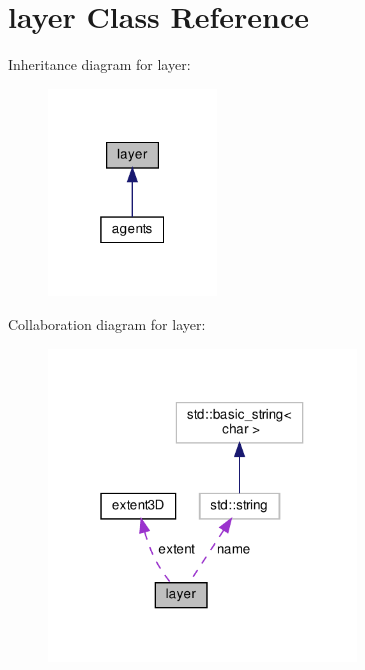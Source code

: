 \hypertarget{classlayer}{}\section{layer Class Reference}
\label{classlayer}


Inheritance diagram for layer\+:\nopagebreak
\begin{figure}[H]
\begin{center}
\leavevmode
\includegraphics[width=127pt]{classlayer__inherit__graph}
\end{center}
\end{figure}


Collaboration diagram for layer\+:\nopagebreak
\begin{figure}[H]
\begin{center}
\leavevmode
\includegraphics[width=232pt]{classlayer__coll__graph}
\end{center}
\end{figure}
